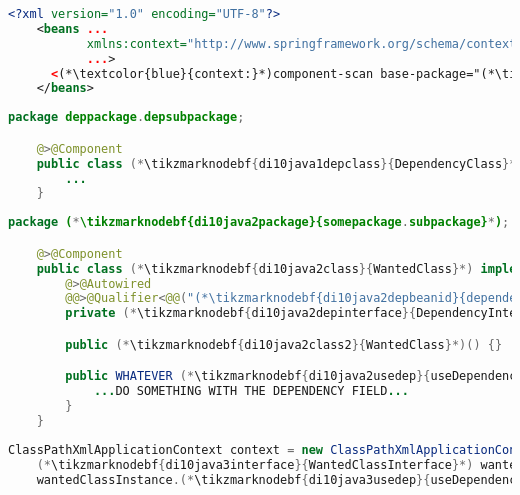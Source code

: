 \begin{lstlisting}[language=XML, title={Configuration XML}]
    <?xml version="1.0" encoding="UTF-8"?>
    <beans ...
           xmlns:context="http://www.springframework.org/schema/context"
           ...>
      <(*\textcolor{blue}{context:}*)component-scan base-package="(*\tikzmarknodebf{di10xml1package}{somepackage.subpackage}[ForestGreen]*)"/>
    </beans>
\end{lstlisting}
\begin{lstlisting}[language=Java, title={Dependency class}]
    package deppackage.depsubpackage;

    @>@Component
    public class (*\tikzmarknodebf{di10java1depclass}{DependencyClass}*) implements (*\tikzmarknodebf{di10java1depinterface}{DependencyInterface}*) {
        ...
    }
\end{lstlisting}
\begin{lstlisting}[language=Java, title={Wanted class with the zero--parameter constructor}]
    package (*\tikzmarknodebf{di10java2package}{somepackage.subpackage}*);

    @>@Component
    public class (*\tikzmarknodebf{di10java2class}{WantedClass}*) implements (*\tikzmarknodebf{di10java2interface}{WantedClassInterface}*) {
        @>@Autowired
        @@>@Qualifier<@@("(*\tikzmarknodebf{di10java2depbeanid}{dependencyClass}[ForestGreen]*)")
        private (*\tikzmarknodebf{di10java2depinterface}{DependencyInterface}*) dependencyField;

        public (*\tikzmarknodebf{di10java2class2}{WantedClass}*)() {}

        public WHATEVER (*\tikzmarknodebf{di10java2usedep}{useDependency}*)() {
            ...DO SOMETHING WITH THE DEPENDENCY FIELD...
        }
    }
\end{lstlisting}
\begin{lstlisting}[language=Java, title={Usage}]
    ClassPathXmlApplicationContext context = new ClassPathXmlApplicationContext("configurationFile.xml");
    (*\tikzmarknodebf{di10java3interface}{WantedClassInterface}*) wantedClassInstance = context.getBean("(*\tikzmarknodebf{di10java3beanid}{wantedClass}[ForestGreen]*)", (*\tikzmarknodebf{di10java3interface2}{WantedClassInterface}*).class);
    wantedClassInstance.(*\tikzmarknodebf{di10java3usedep}{useDependency}*)();
\end{lstlisting}
\newpage

